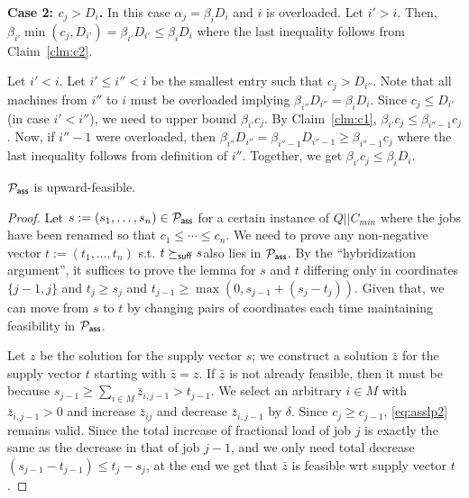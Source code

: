 \noindent
{\bf Case 2: $c_j > D_i$.} In this case $\alpha_j = \beta_iD_i$ and $i$ is overloaded. Let $i' > i$. Then, $\beta_{i'}\min(c_j,D_{i'}) = \beta_{i'}D_{i'} \leq \beta_iD_i$ where the last inequality follows from Claim~\ref{clm:c2}.


Let $i' < i$. Let $i'\leq i'' < i$ be the smallest entry such that $c_j > D_{i''}$. Note that all machines from $i''$ to $i$ must be overloaded implying $\beta_{i''}D_{i''} = \beta_iD_i$.
Since $c_j \leq D_{i'}$ (in case $i' < i''$), we need to upper bound $\beta_{i'}c_j$. 
By Claim~\ref{clm:c1}, $\beta_{i'}c_j \leq \beta_{i''-1}c_j$. Now, if $i''-1$ were overloaded, 
then $\beta_{i''}D_{i''} = \beta_{i''-1}D_{i''-1} \geq \beta_{i''-1}c_j$ where the last inequality follows from definition of $i''$. Together, we get $\beta_{i'}c_j \leq \beta_iD_i$.
\def\y{\bar{y}}
\def\z{\bar{z}}
\def\yy{\bar{\bar{y}}}
\begin{lemma}\label{lem:conf-is-uf}
	${\cal P}_\mathsf{ass}$ is upward-feasible.
\end{lemma}
\begin{proof}
	Let $s := (s_1,\ldots,s_n)\in {\cal P}_\mathsf{ass}$ for a certain instance of $Q||C_{min}$ where the jobs have been renamed so that $c_1\leq \cdots \leq c_n$. We need to prove any non-negative vector $t := (t_1,\ldots,t_n)$ s.t. $t\succeq_{\mathsf{suff}} s$also lies in ${\cal P}_\mathsf{ass}$. 
	By the ``hybridization argument'', it suffices to prove the lemma for  $s$ and $t$ differing only in coordinates $\{j-1,j\}$ and $ t_j\ge s_j$ and $t_{j-1} \geq \max(0,s_{j-1} + (s_j - t_j))$.
	Given that, we can move from $s$ to $t$ by changing pairs of coordinates each time maintaining feasibility in ${\cal P}_\mathsf{ass}$.
	
	Let $z$ be the solution for the supply vector $s$; we construct a solution $\z$  for the supply vector $t$ starting with $\z = z$.
	If $\z$ is not already feasible, then it must be because $s_{j-1} \geq \sum_{i\in M} \z_{i,j-1} > t_{j-1}$.
	We select an arbitrary $i\in M$ with $\z_{i,j-1} > 0$ and increase $\z_{ij}$ and decrease $\z_{i,j-1}$ by $\delta$. Since $c_j \geq c_{j-1}$, \eqref{eq:asslp2} remains valid.
	Since the total increase of fractional load of job $j$ is exactly the same as the decrease in that of job $j-1$, and we only need total  decrease $(s_{j-1} -t_{j-1}) \leq t_j - s_j$, at the end we get that $\z$ is feasible wrt supply vector $t$.
	
\end{proof}
